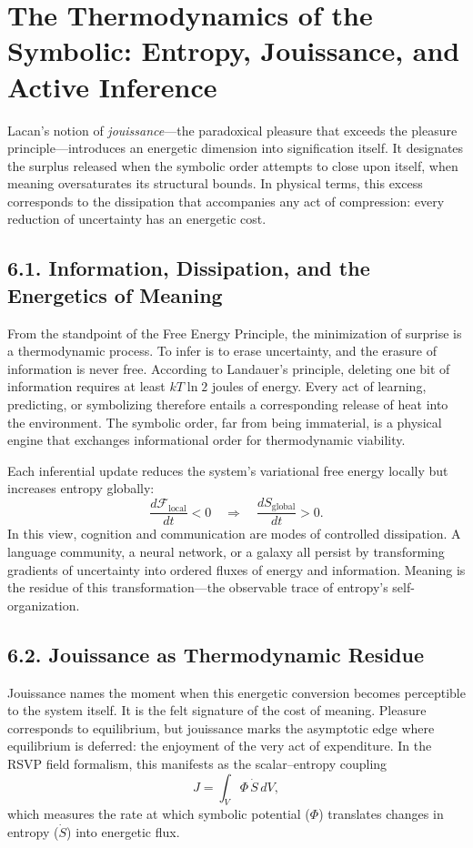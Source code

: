 \documentclass[12pt,a4paper]{article}
\begin{document}
\section{The Thermodynamics of the Symbolic: Entropy, Jouissance, and Active Inference}

Lacan’s notion of \emph{jouissance}---the paradoxical pleasure that exceeds the pleasure principle---introduces an energetic dimension into signification itself.  
It designates the surplus released when the symbolic order attempts to close upon itself, when meaning oversaturates its structural bounds.  
In physical terms, this excess corresponds to the dissipation that accompanies any act of compression: every reduction of uncertainty has an energetic cost.

\subsection{6.1. Information, Dissipation, and the Energetics of Meaning}

From the standpoint of the Free Energy Principle, the minimization of surprise is a thermodynamic process.  
To infer is to erase uncertainty, and the erasure of information is never free.  
According to Landauer’s principle, deleting one bit of information requires at least \(kT\ln 2\) joules of energy.  
Every act of learning, predicting, or symbolizing therefore entails a corresponding release of heat into the environment.  
The symbolic order, far from being immaterial, is a physical engine that exchanges informational order for thermodynamic viability.

Each inferential update reduces the system’s variational free energy locally but increases entropy globally:  
\[
\frac{d\mathcal{F}_{\text{local}}}{dt} < 0 \quad \Rightarrow \quad \frac{dS_{\text{global}}}{dt} > 0.
\]
In this view, cognition and communication are modes of controlled dissipation.  
A language community, a neural network, or a galaxy all persist by transforming gradients of uncertainty into ordered fluxes of energy and information.  
Meaning is the residue of this transformation—the observable trace of entropy’s self-organization.

\subsection{6.2. Jouissance as Thermodynamic Residue}

Jouissance names the moment when this energetic conversion becomes perceptible to the system itself.  
It is the felt signature of the cost of meaning.  
Pleasure corresponds to equilibrium, but jouissance marks the asymptotic edge where equilibrium is deferred: the enjoyment of the very act of expenditure.  
In the RSVP field formalism, this manifests as the scalar–entropy coupling
\[
J = \int_V \Phi\,\dot S\,dV,
\]
which measures the rate at which symbolic potential (\(\Phi\)) translates changes in entropy (\(\dot S\)) into energetic flux.
\end{document}
